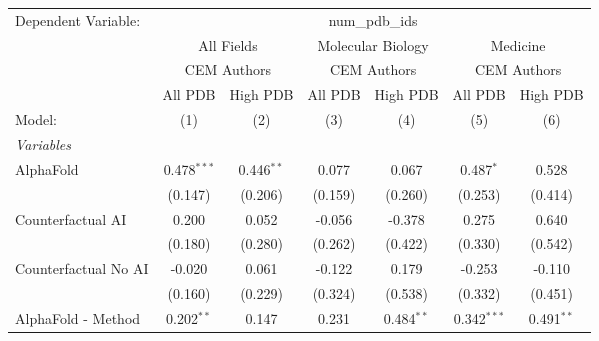 \begingroup
\centering
\begin{tabular}{lcccccc}
   \tabularnewline \midrule \midrule
   Dependent Variable: & \multicolumn{6}{c}{num\_pdb\_ids}\\
 & \multicolumn{2}{c}{All Fields} & \multicolumn{2}{c}{Molecular Biology} & \multicolumn{2}{c}{Medicine} \\
\cmidrule(lr){2-3} \cmidrule(lr){4-5} \cmidrule(lr){6-7}
 & \multicolumn{2}{c}{CEM Authors} & \multicolumn{2}{c}{CEM Authors} & \multicolumn{2}{c}{CEM Authors} \\
\cmidrule(lr){2-3} \cmidrule(lr){4-5} \cmidrule(lr){6-7}
 & \multicolumn{1}{c}{All PDB} & \multicolumn{1}{c}{High PDB} & \multicolumn{1}{c}{All PDB} & \multicolumn{1}{c}{High PDB} & \multicolumn{1}{c}{All PDB} & \multicolumn{1}{c}{High PDB} \\
\cmidrule(lr){2-2} \cmidrule(lr){3-3} \cmidrule(lr){4-4} \cmidrule(lr){5-5} \cmidrule(lr){6-6} \cmidrule(lr){7-7}
   Model:                                                     & (1)            & (2)          & (3)         & (4)          & (5)            & (6)\\  
   \midrule
   \emph{Variables}\\
   AlphaFold                                                  & 0.478$^{***}$  & 0.446$^{**}$ & 0.077       & 0.067        & 0.487$^{*}$    & 0.528\\   
                                                              & (0.147)        & (0.206)      & (0.159)     & (0.260)      & (0.253)        & (0.414)\\   
   Counterfactual AI                                          & 0.200          & 0.052        & -0.056      & -0.378       & 0.275          & 0.640\\   
                                                              & (0.180)        & (0.280)      & (0.262)     & (0.422)      & (0.330)        & (0.542)\\   
   Counterfactual No AI                                       & -0.020         & 0.061        & -0.122      & 0.179        & -0.253         & -0.110\\   
                                                              & (0.160)        & (0.229)      & (0.324)     & (0.538)      & (0.332)        & (0.451)\\   
   AlphaFold - Method                                         & 0.202$^{**}$   & 0.147        & 0.231       & 0.484$^{**}$ & 0.342$^{***}$  & 0.491$^{**}$\\   

\end{tabular}
